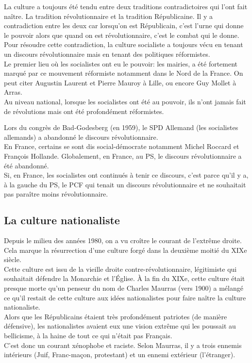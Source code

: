 \documentclass[12pt, a4paper, openany]{book}
\begin{document}
La culture a toujours été tendu entre deux traditions contradictoires qui l'ont fait naître. La tradition révolutionnaire et la tradition Républicaine. Il y a contradiction entre les deux car lorsqu'on est Républicain, c'est l'urne qui donne le pouvoir alors que quand on est révolutionnaire, c'est le combat qui le donne. \\
Pour résoudre cette contradiction, la culture socialiste a toujours vécu en tenant un discours révolutionnaire mais en tenant des politiques réformistes. \\
Le premier lieu où les socialistes ont eu le pouvoir: les mairies, a été fortement marqué par ce mouvement réformiste notamment dans le Nord de la France. On peut citer Augustin Laurent et Pierre Mauroy à Lille, ou encore Guy Mollet à Arras. \\
Au niveau national, lorsque les socialistes ont été au pouvoir, ils n'ont jamais fait de révolutions mais ont été profondément réformistes.


Lors du congrès de Bad-Godesberg (en 1959), le SPD Allemand (les socialistes allemands) a abandonné le discours révolutionnaire. \\
En France, certains se sont dis social-démocrate notamment Michel Roccard et François Hollande. Globalement, en France, au PS, le discours révolutionnaire a été abandonné. \\
Si, en France, les socialistes ont continués à tenir ce discours, c'est parce qu'il y a, à la gauche du PS, le PCF qui tenait un discours révolutionnaire et ne souhaitait pas paraître moins révolutionnaire. 

\subsection{La culture nationaliste}

Depuis le milieu des années 1980, on a vu croître le courant de l'extrême droite. Cela marque la résurrection d'une culture forgé dans la deuxième moitié du XIXe siècle. \\
Cette culture est issu de la vieille droite contre-révolutionnaire, légitimiste qui souhaitait défendre la Monarchie et l'Église. À la fin du XIXe, cette culture était presque morte qu'un penseur du nom de Charles Maurras (vers 1900) a mélangé ce qu'il restait de cette culture aux idées nationalistes pour faire naître la culture nationaliste. \\
Alors que les Républicains étaient très profondément patriotes (de manière défensive), les nationalistes avaient eux une vision extrême qui les poussait au bellicisme, à la haine de tout ce qui n'était pas Français. \\
C'est donc un courant xénophobe et raciste. Selon Maurras, il y a trois ennemis intérieurs (Juif, Franc-maçon, protestant) et un ennemi extérieur (l'étranger). 
\end{document}
